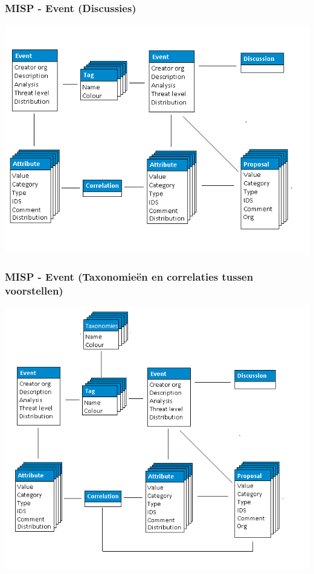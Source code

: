 \begin{frame}
    \frametitle{MISP - Event (Discussies)}
    \includegraphics[scale=0.45]{screenshots/datamodel6.png}
\end{frame}

\begin{frame}
    \frametitle{MISP - Event \newline (Taxonomieën en correlaties tussen voorstellen)}
    \includegraphics[scale=0.35]{screenshots/datamodel7.png}
\end{frame}

